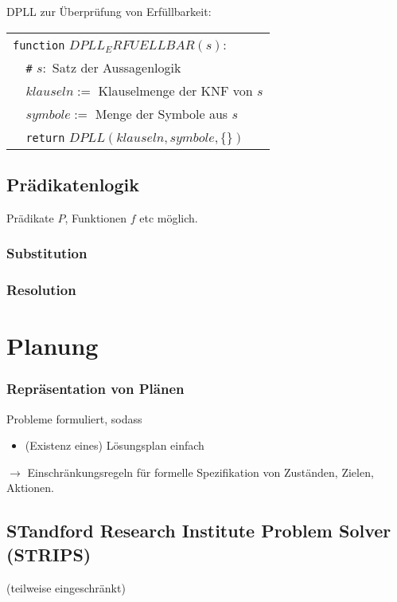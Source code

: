 DPLL zur Überprüfung von Erfüllbarkeit:
\begin{center}
\begin{tabular}{l}
\verb|function| $DPLL_ERFUELLBAR(s):$ \\
\verb|  #| $s:$ Satz der Aussagenlogik \\
\verb|  | $klauseln :=$ Klauselmenge der KNF von $s$ \\
\verb|  | $symbole :=$ Menge der Symbole aus $s$ \\
\verb|  return| $DPLL(klauseln, symbole, \{\})$
\end{tabular}
\end{center}

\subsection{Prädikatenlogik}

Prädikate $P$, Funktionen $f$ etc möglich.

\subsubsection{Substitution}

\subsubsection{Resolution}

\section{Planung}

\subsubsection*{Repräsentation von Plänen}

Probleme formuliert, sodass
\begin{itemize}
\item (Existenz eines) Lösungsplan einfach
\end{itemize}
$\to$ Einschränkungsregeln für formelle Spezifikation von Zuständen, Zielen, Aktionen.

\subsection{STandford Research Institute Problem Solver (STRIPS)}

(teilweise eingeschränkt)

